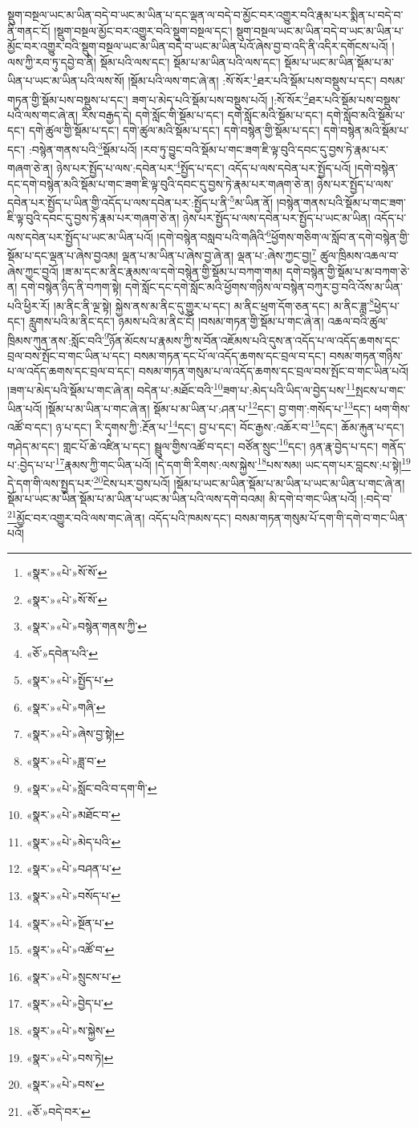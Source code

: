 སྡུག་བསྔལ་ཡང་མ་ཡིན་བདེ་བ་ཡང་མ་ཡིན་པ་དང་ལྡན་ལ་བདེ་བ་མྱོང་བར་འགྱུར་བའི་རྣམ་པར་སྨིན་པ་བདེ་བ་ནི་གནང་ངོ། །སྡུག་བསྔལ་མྱོང་བར་འགྱུར་བའི་སྡུག་བསྔལ་དང་། སྡུག་བསྔལ་ཡང་མ་ཡིན་བདེ་བ་ཡང་མ་ཡིན་པ་མྱོང་བར་འགྱུར་བའི་སྡུག་བསྔལ་ཡང་མ་ཡིན་བདེ་བ་ཡང་མ་ཡིན་པའོ་ཞེས་བྱ་བ་འདི་ནི་འདིར་དགོངས་པའོ། །ལས་ཀྱི་རབ་ཏུ་དབྱེ་བ་ནི། སྡོམ་པའི་ལས་དང་། སྡོམ་པ་མ་ཡིན་པའི་ལས་དང་། སྡོམ་པ་ཡང་མ་ཡིན་སྡོམ་པ་མ་ཡིན་པ་ཡང་མ་ཡིན་པའི་ལས་སོ། །སྡོམ་པའི་ལས་གང་ཞེ་ན། :སོ་སོར་\footnote{«སྣར་»«པེ་»སོ་སོ་}ཐར་པའི་སྡོམ་པས་བསྡུས་པ་དང་། བསམ་གཏན་གྱི་སྡོམ་པས་བསྡུས་པ་དང་། ཟག་པ་མེད་པའི་སྡོམ་པས་བསྡུས་པའོ། །:སོ་སོར་\footnote{«སྣར་»«པེ་»སོ་སོ་}ཐར་པའི་སྡོམ་པས་བསྡུས་པའི་ལས་གང་ཞེ་ན། རིས་བརྒྱད་དེ། དགེ་སློང་གི་སྡོམ་པ་དང་། དགེ་སློང་མའི་སྡོམ་པ་དང་། དགེ་སློབ་མའི་སྡོམ་པ་དང་། དགེ་ཚུལ་གྱི་སྡོམ་པ་དང་། དགེ་ཚུལ་མའི་སྡོམ་པ་དང་། དགེ་བསྙེན་གྱི་སྡོམ་པ་དང་། དགེ་བསྙེན་མའི་སྡོམ་པ་དང་། :བསྙེན་གནས་པའི་\footnote{«སྣར་»«པེ་»བསྙེན་གནས་ཀྱི་}སྡོམ་པའོ། །རབ་ཏུ་བྱུང་བའི་སྡོམ་པ་གང་ཟག་ཇི་ལྟ་བུའི་དབང་དུ་བྱས་ཏེ་རྣམ་པར་གཞག་ཅེ་ན། ཉེས་པར་སྤྱོད་པ་ལས་:དབེན་པར་\footnote{«ཅོ་»དབེན་པའི་}སྤྱོད་པ་དང་། འདོད་པ་ལས་དབེན་པར་སྤྱོད་པའོ། །དགེ་བསྙེན་དང་དགེ་བསྙེན་མའི་སྡོམ་པ་གང་ཟག་ཇི་ལྟ་བུའི་དབང་དུ་བྱས་ཏེ་རྣམ་པར་གཞག་ཅེ་ན། ཉེས་པར་སྤྱོད་པ་ལས་དབེན་པར་སྤྱོད་པ་ཡིན་གྱི་འདོད་པ་ལས་དབེན་པར་:སྤྱོད་པ་ནི་\footnote{«སྣར་»«པེ་»སྤྱོད་པ་}མ་ཡིན་ནོ། །བསྙེན་གནས་པའི་སྡོམ་པ་གང་ཟག་ཇི་ལྟ་བུའི་དབང་དུ་བྱས་ཏེ་རྣམ་པར་གཞག་ཅེ་ན། ཉེས་པར་སྤྱོད་པ་ལས་དབེན་པར་སྤྱོད་པ་ཡང་མ་ཡིན། འདོད་པ་ལས་དབེན་པར་སྤྱོད་པ་ཡང་མ་ཡིན་པའོ། །དགེ་བསྙེན་བསླབ་པའི་གཞིའི་\footnote{«སྣར་»«པེ་»གཞི་}ཕྱོགས་གཅིག་ལ་སློབ་ན་དགེ་བསྙེན་གྱི་སྡོམ་པ་དང་ལྡན་པ་ཞེས་བྱའམ། ལྡན་པ་མ་ཡིན་པ་ཞེས་བྱ་ཞེ་ན། ལྡན་པ་:ཞེས་ཀྱང་བྱ།\footnote{«སྣར་»«པེ་»ཞེས་བྱ་སྟེ།} ཚུལ་ཁྲིམས་འཆལ་བ་ཞེས་ཀྱང་བྱའོ། །ཟ་མ་དང་མ་ནིང་རྣམས་ལ་དགེ་བསྙེན་གྱི་སྡོམ་པ་བཀག་གམ། དགེ་བསྙེན་གྱི་སྡོམ་པ་མ་བཀག་ཅེ་ན། དགེ་བསྙེན་ཉིད་ནི་བཀག་སྟེ། དགེ་སློང་དང་དགེ་སློང་མའི་ཕྱོགས་གཉིས་ལ་བསྙེན་བཀུར་བྱ་བའི་འོས་མ་ཡིན་པའི་ཕྱིར་རོ། །མ་ནིང་ནི་ལྔ་སྟེ། སྐྱེས་ནས་མ་ནིང་དུ་གྱུར་པ་དང་། མ་ནིང་ཕྲག་དོག་ཅན་དང་། མ་ནིང་ཟླ་\footnote{«སྣར་»«པེ་»ཟླ་བ་}ཕྱེད་པ་དང་། རླུགས་པའི་མ་ནིང་དང་། ཉམས་པའི་མ་ནིང་ངོ། །བསམ་གཏན་གྱི་སྡོམ་པ་གང་ཞེ་ན། འཆལ་བའི་ཚུལ་ཁྲིམས་ཀུན་ནས་:སློང་བའི་\footnote{«སྣར་»«པེ་»སློང་བའི་བ་དག་གི་}ཉོན་མོངས་པ་རྣམས་ཀྱི་ས་བོན་འཇོམས་པའི་དུས་ན་འདོད་པ་ལ་འདོད་ཆགས་དང་བྲལ་བས་སྤོང་བ་གང་ཡིན་པ་དང་། བསམ་གཏན་དང་པོ་ལ་འདོད་ཆགས་དང་བྲལ་བ་དང་། བསམ་གཏན་གཉིས་པ་ལ་འདོད་ཆགས་དང་བྲལ་བ་དང་། བསམ་གཏན་གསུམ་པ་ལ་འདོད་ཆགས་དང་བྲལ་བས་སྤོང་བ་གང་ཡིན་པའོ། །ཟག་པ་མེད་པའི་སྡོམ་པ་གང་ཞེ་ན། བདེན་པ་:མཐོང་བའི་\footnote{«སྣར་»«པེ་»མཐོང་བ་}ཟག་པ་:མེད་པའི་ཡིད་ལ་བྱེད་པས་\footnote{«སྣར་»«པེ་»མེད་པའི་}སྤངས་པ་གང་ཡིན་པའོ། །སྡོམ་པ་མ་ཡིན་པ་གང་ཞེ་ན། སྡོམ་པ་མ་ཡིན་པ་:ཤན་པ་\footnote{«སྣར་»«པེ་»བཤན་པ་}དང་། བྱ་གག་:གསོད་པ་\footnote{«སྣར་»«པེ་»བསོད་པ་}དང་། ཕག་གིས་འཚོ་བ་དང་། ཉ་པ་དང་། རི་དྭགས་ཀྱི་:རྔོན་པ་\footnote{«སྣར་»«པེ་»སྔོན་པ་}དང་། བྱ་པ་དང་། བོང་རྒྱས་:འཆོར་བ་\footnote{«སྣར་»«པེ་»འཚོ་བ་}དང་། ཆོམ་རྐུན་པ་དང་། གཤེད་མ་དང་། གླང་པོ་ཆེ་འཛིན་པ་དང་། སྦྲུལ་གྱིས་འཚོ་བ་དང་། བཙོན་སྲུང་\footnote{«སྣར་»«པེ་»སྲུངས་པ་}དང་། ཉན་རྣ་བྱེད་པ་དང་། གནོད་པ་:བྱེད་པ་པ་\footnote{«སྣར་»«པེ་»བྱེད་པ་}རྣམས་ཀྱི་གང་ཡིན་པའོ། །དེ་དག་གི་རིགས་:ལས་སྐྱེས་\footnote{«སྣར་»«པེ་»ས་སྐྱེས་}པས་སམ། ཡང་དག་པར་བླངས་:པ་སྟེ།\footnote{«སྣར་»«པེ་»བས་ཏེ།} དེ་དག་གི་ལས་སྤྱད་པར་\footnote{«སྣར་»«པེ་»བས་}ངེས་པར་བྱས་པའོ། །སྡོམ་པ་ཡང་མ་ཡིན་སྡོམ་པ་མ་ཡིན་པ་ཡང་མ་ཡིན་པ་གང་ཞེ་ན། སྡོམ་པ་ཡང་མ་ཡིན་སྡོམ་པ་མ་ཡིན་པ་ཡང་མ་ཡིན་པའི་ལས་དགེ་བའམ། མི་དགེ་བ་གང་ཡིན་པའོ། །:བདེ་བ་\footnote{«ཅོ་»བདེ་བར་}མྱོང་བར་འགྱུར་བའི་ལས་གང་ཞེ་ན། འདོད་པའི་ཁམས་དང་། བསམ་གཏན་གསུམ་པོ་དག་གི་དགེ་བ་གང་ཡིན་པའོ། 